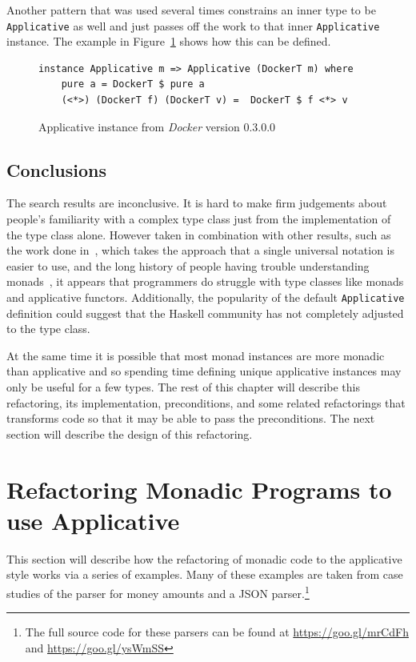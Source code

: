 Another pattern that was used several times constrains an inner type to be \texttt{Applicative} as well and just passes off the work to that inner \texttt{Applicative} instance. The example in Figure~\ref{dockerApp} shows how this can be defined.

\begin{figure}[t]
\begin{lstlisting}
instance Applicative m => Applicative (DockerT m) where
    pure a = DockerT $ pure a
    (<*>) (DockerT f) (DockerT v) =  DockerT $ f <*> v
\end{lstlisting}
\caption{Applicative instance from \textit{Docker} version 0.3.0.0}
\label{dockerApp}
\end{figure}

\subsection{Conclusions}

The search results are inconclusive. It is hard to make firm judgements about people's familiarity with a complex type class just from the implementation of the type class alone. However taken in combination with other results, such as the work done in~\cite{applicativeDo}, which takes the approach that a single universal notation is easier to use, and the long history of people having trouble understanding monads~\citep{monadTutorialFallacy}, it appears that programmers do struggle with type classes like monads and applicative functors. Additionally, the popularity of the default \texttt{Applicative} definition could suggest that the Haskell community has not completely adjusted to the type class.

At the same time it is possible that most monad instances are more monadic than applicative and so spending time defining unique applicative instances may only be useful for a few types. The rest of this chapter will describe this refactoring, its implementation, preconditions, and some related refactorings that transforms code so that it may be able to pass the preconditions. The next section will describe the design of this refactoring.

\section{Refactoring Monadic Programs to use Applicative}
\label{sec:appRefact}

This section will describe how the refactoring of monadic code to the applicative style works via a series of examples. Many of these examples are taken from case studies of the parser for money amounts and a JSON parser.\footnote{The full source code for these parsers can be found at \url{https://goo.gl/mrCdFh} and \url{https://goo.gl/ysWmSS}} 

